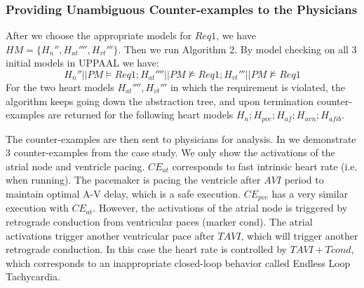 \subsubsection{Providing Unambiguous Counter-examples to the Physicians}
After we choose the appropriate models for $Req1$, we have 
$HM=\{H_n'',H_{at}'''',H_{vt}'''\}$.
Then we run Algorithm 2. By model checking on all 3 initial models in UPPAAL we have: 
$$H_n''||PM\models Req1;H_{at}''''||PM\not\models Req1;H_{vt}'''||PM\not\models Req1$$
For the two heart models $H_{at}'''',H_{vt}'''$ in which the requirement is violated, the algorithm keeps going down the abstraction tree, and upon termination counter-examples are returned for the following heart models
$H_{n};H_{pvc};H_{af};H_{avn};H_{afib}$.



The counter-examples are then sent to physicians for analysis. In  we demonstrate 3 counter-examples from the case study. We only show the activations of the atrial node and ventricle pacing. 
$CE_{at}$ corresponds to fast intrinsic heart rate (i.e. when running). The pacemaker is pacing the ventricle after $AVI$ period %
to maintain optimal A-V delay, which is a safe execution. 
$CE_{pvc}$ has a very similar execution with $CE_{at}$. However, the activations of the atrial node is triggered by retrograde conduction from ventricular paces (marker \textsf{cond}). The atrial activations trigger another ventricular pace after $TAVI$, which will trigger another retrograde conduction. In this case the heart rate is controlled by $TAVI+Tcond$, which corresponds to an inappropriate closed-loop behavior called Endless Loop Tachycardia.

